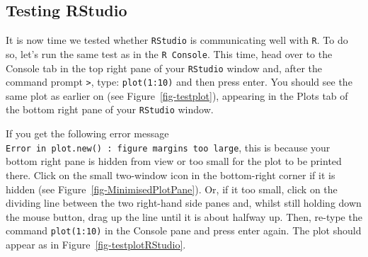 \documentclass[
  letterpaper,
  DIV=11,
  numbers=noendperiod]{scrreprt}
\begin{document}
\subsection{Testing RStudio}\label{testing-rstudio}

It is now time we tested whether \texttt{RStudio} is communicating well
with \texttt{R}. To do so, let's run the same test as in the
\texttt{R\ Console}. This time, head over to the Console tab in the top
right pane of your \texttt{RStudio} window and, after the command prompt
\texttt{\textgreater{}}, type: \texttt{plot(1:10)} and then press enter.
You should see the same plot as earlier on (see
Figure~\ref{fig-testplot}), appearing in the Plots tab of the bottom
right pane of your \texttt{RStudio} window.

If you get the following error message
\texttt{Error\ in\ plot.new()\ :\ figure\ margins\ too\ large}, this is
because your bottom right pane is hidden from view or too small for the
plot to be printed there. Click on the small two-window icon in the
bottom-right corner if it is hidden (see
Figure~\ref{fig-MinimisedPlotPane}). Or, if it too small, click on the
dividing line between the two right-hand side panes and, whilst still
holding down the mouse button, drag up the line until it is about
halfway up. Then, re-type the command \texttt{plot(1:10)} in the Console
pane and press enter again. The plot should appear as in
Figure~\ref{fig-testplotRStudio}.
\end{document}
